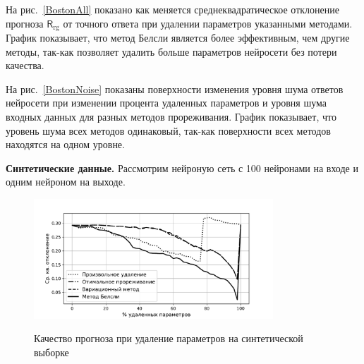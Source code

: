 На рис.~\ref{BostonAll} показано как меняется среднеквадратическое отклонение прогноза $\mathsf{R}_{\text{rg}}$ от точного ответа  при удалении параметров указанными методами. График показывает, что метод Белсли является более эффективным, чем другие методы, так-как позволяет удалить больше параметров нейросети без потери качества.

На рис.~\ref{BostonNoise} показаны поверхности изменения уровня шума ответов нейросети при изменении процента удаленных параметров и уровня шума входных данных для разных методов прореживания. График показывает, что уровень шума всех методов одинаковый, так-как поверхности всех методов находятся на одном уровне.


\textbf{Синтетические данные. } Рассмотрим нейроную сеть с 100 нейронами на входе и одним нейроном на выходе.

\begin{figure}[h!t]\center
\includegraphics[width=0.8\textwidth]{plots/grabovoy/synt_all.pdf}\\
\caption{Качество прогноза при удаление параметров на синтетической выборке}
\label{Data1All}
\end{figure}

